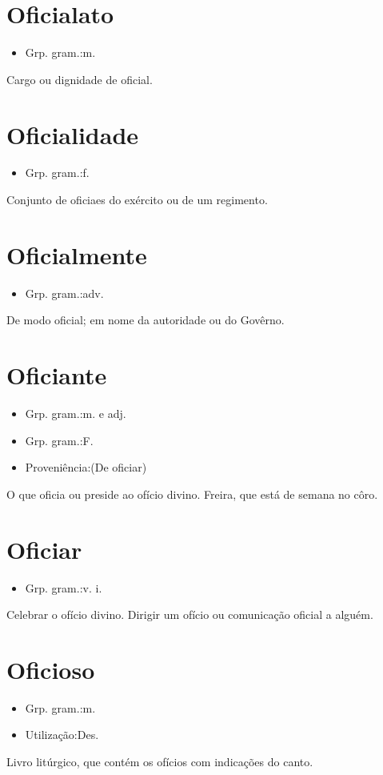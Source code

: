\section{Oficialato}
\begin{itemize}
\item {Grp. gram.:m.}
\end{itemize}
Cargo ou dignidade de oficial.
\section{Oficialidade}
\begin{itemize}
\item {Grp. gram.:f.}
\end{itemize}
Conjunto de oficiaes do exército ou de um regimento.
\section{Oficialmente}
\begin{itemize}
\item {Grp. gram.:adv.}
\end{itemize}
De modo oficial; em nome da autoridade ou do Govêrno.
\section{Oficiante}
\begin{itemize}
\item {Grp. gram.:m.  e  adj.}
\end{itemize}
\begin{itemize}
\item {Grp. gram.:F.}
\end{itemize}
\begin{itemize}
\item {Proveniência:(De \textunderscore oficiar\textunderscore )}
\end{itemize}
O que oficia ou preside ao ofício divino.
Freira, que está de semana no côro.
\section{Oficiar}
\begin{itemize}
\item {Grp. gram.:v. i.}
\end{itemize}
Celebrar o ofício divino.
Dirigir um ofício ou comunicação oficial a alguém.
\section{Oficioso}
\begin{itemize}
\item {Grp. gram.:m.}
\end{itemize}
\begin{itemize}
\item {Utilização:Des.}
\end{itemize}
Livro litúrgico, que contém os ofícios com indicações do canto.
